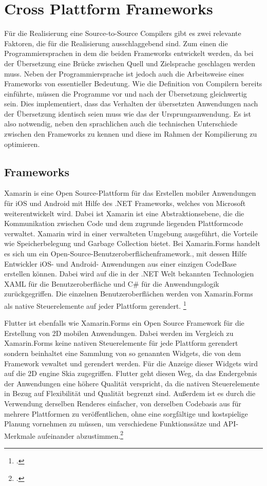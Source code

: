 \chapter{Cross Plattform Frameworks}
\label{chap:CrossPlattformFrameworks}

Für die Realisierung eine Source-to-Source Compilers gibt es zwei relevante Faktoren,  die für die Realisierung ausschlaggebend sind.  Zum einen die Programmiersprachen in dem die beiden Frameworks entwickelt werden,  da bei der Übersetzung eine Brücke zwischen Quell und Zielsprache geschlagen werden muss.  Neben der Programmiersprache ist jedoch auch die Arbeitsweise eines Frameworks von essentieller Bedeutung.  Wie die Definition von Compilern bereits einführte,  müssen die Programme vor und nach der Übersetzung gleichwertig sein.  Dies implementiert,  dass das Verhalten der übersetzten Anwendungen nach der Übersetzung identisch seien muss wie das der Ursprungsanwendung.  Es ist also notwendig,  neben den sprachlichen auch die technischen Unterschiede zwischen den Frameworks zu kennen und diese im Rahmen der Kompilierung zu optimieren. 

\section{Frameworks}
Xamarin is eine Open Source-Plattform für das Erstellen mobiler Anwendungen für iOS und Android mit Hilfe des .NET Frameworks, welches von Microsoft weiterentwickelt wird.  Dabei ist Xamarin ist eine Abstraktionsebene, die die Kommunikation zwischen Code und dem zugrunde liegenden Plattformcode verwaltet.  Xamarin wird in einer verwalteten Umgebung ausgeführt, die Vorteile wie Speicherbelegung und Garbage Collection bietet.  Bei Xamarin.Forms handelt es sich um ein Open-Source-Benutzeroberflächenframework., mit dessen Hilfe Entwickler iOS- und Android- Anwendungen aus einer einzigen CodeBase erstellen können.  Dabei wird auf die in der .NET Welt bekannten Technologien XAML  für die Benutzeroberfläche und C\# für die Anwendungslogik zurückgegriffen.  Die einzelnen Benutzeroberflächen werden von Xamarin.Forms als native Steuerelemente auf jeder Plattform gerendert.  \footcite[Vgl.][Abgerufen am \today]{MicrosoftWhatIsXam2020}

Flutter ist ebenfalls wie Xamarin.Forms ein Open Source Framework für die Erstellung von 2D mobilen Anwendungen.  Dabei werden im Vergleich zu Xamarin.Forms keine nativen Steuerelemente für jede Plattform gerendert sondern beinhaltet eine Sammlung von so genannten Widgets, die von dem Framework vewaltet und gerendert werden.  Für die Anzeige dieser Widgets wird auf die 2D engine Skia zugegriffen.  Flutter geht diesen Weg,  da das Endergebnis der Anwendungen eine höhere Qualität verspricht, da die nativen Steuerelemente in Bezug auf Flexibilität und Qualität begrenzt sind.  Außerdem ist es durch die Verwendung derselben Renderes einfacher, von derselben Codebasis aus für mehrere Plattformen zu veröffentlichen,  ohne eine sorgfältige und kostspielige Planung vornehmen zu müssen,  um verschiedene Funktionssätze und API-Merkmale aufeinander abzustimmen.\footcite[Vgl.][Abgerufen am \today]{GoogleFlutterFAQ2020}

